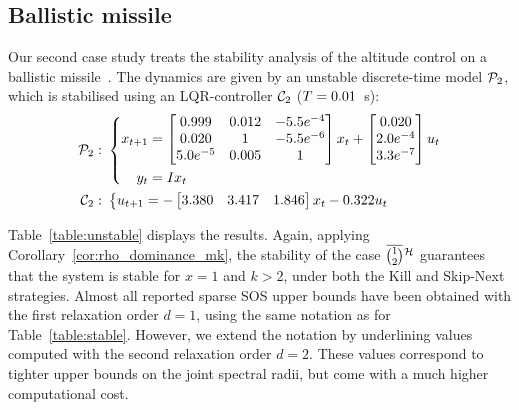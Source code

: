 \subsection{Ballistic missile}\label{sec:eval:unstable}
Our second case study treats the stability analysis of the altitude control on a ballistic missile~\cite{Blakelock:1991, Sree:2006}.
The dynamics are given by an unstable discrete-time model $\mathcal{P}_2$, which is stabilised using an LQR-controller $\mathcal{C}_2$ ($T = 0.01$~s):
\begin{equation*}
    \begin{aligned}
        \mathcal{P}_2: \,\, &\left\{
        \begin{aligned}
            x_{t+1} &= \begin{bmatrix}
                0.999 & 0.012 & -5.5 e^{-4} \\
                0.020 & 1 & -5.5 e^{-6} \\
                5.0 e^{-5} & 0.005 & 1 \\
            \end{bmatrix} x_t + \begin{bmatrix}
                0.020 \\
                2.0e^{-4} \\
                3.3e^{-7} \\
            \end{bmatrix}u_t \\
            y_t &= I x_t
        \end{aligned} \right. \\
        \mathcal{C}_2: \,\, &\left\{
        \begin{aligned}
            u_{t+1} &= -\begin{bmatrix}
                3.380 & 3.417 & 1.846
            \end{bmatrix} x_t - 0.322 u_t
        \end{aligned}\right.
    \end{aligned}
\end{equation*}

Table~\ref{table:unstable} displays the results.
Again, applying Corollary~\ref{cor:rho_dominance_mk}, the stability of the case $\overbar{\binom{1}{2}}^{\strat}$ guarantees that the system is stable for $x=1$ and $k>2$, under both the Kill and Skip-Next strategies.
Almost all reported sparse SOS upper bounds have been obtained with the first relaxation order $d=1$, using the same notation as for Table~\ref{table:stable}.
However, we extend the notation by underlining values computed with the second relaxation order $d=2$.
These values correspond to tighter upper bounds on the joint spectral radii, but come with a much higher computational cost.

